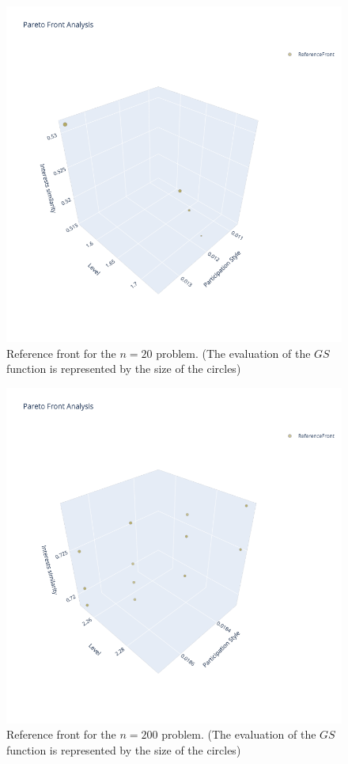 \begin{figure}
    \centering
    \includegraphics[width=\textwidth]{images/reference_front_20.png}
    \caption{Reference front for the $n=20$ problem. (The evaluation of the $GS$ function is represented by the size of the circles)}
    \label{fig:reference_front_20}
\end{figure}

\begin{figure}
    \centering
    \includegraphics[width=\textwidth]{images/reference_front_200.png}
    \caption{Reference front for the $n=200$ problem. (The evaluation of the $GS$ function is represented by the size of the circles)}
    \label{fig:reference_front_200}
\end{figure}

